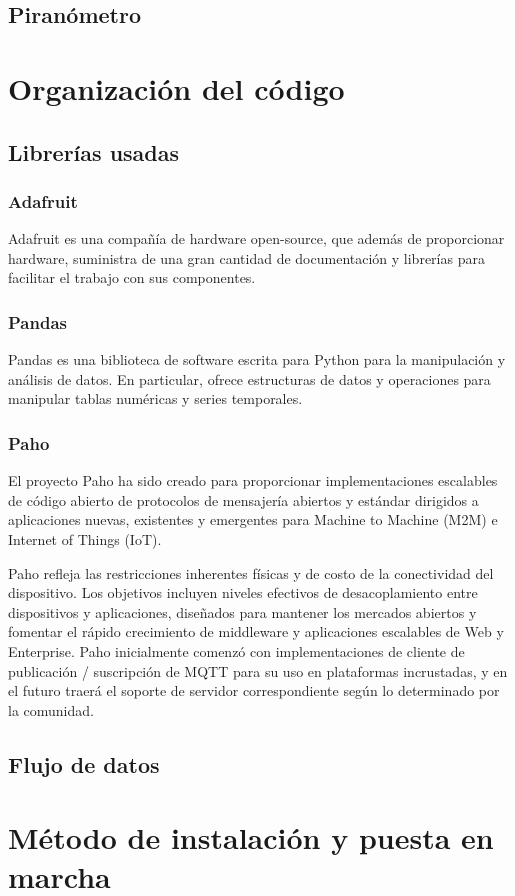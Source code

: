 \subsection{Piranómetro}


\section{Organización del código}
\label{makereference4.3} 
	\subsection{Librerías usadas}
		\subsubsection{Adafruit}
		Adafruit es una compañía de hardware open-source, que además de proporcionar hardware, suministra de una gran cantidad de documentación y librerías para facilitar el trabajo con sus componentes.
		
		\subsubsection{Pandas}
		Pandas es una biblioteca de software escrita para Python para la manipulación y análisis de datos. En particular, ofrece estructuras de datos y operaciones para manipular tablas numéricas y series temporales.
		
		\subsubsection{Paho}
		El proyecto Paho ha sido creado para proporcionar implementaciones escalables de código abierto de protocolos de mensajería abiertos y estándar dirigidos a aplicaciones nuevas, existentes y emergentes para Machine to Machine (M2M) e Internet of Things (IoT).
		
		Paho refleja las restricciones inherentes físicas y de costo de la conectividad del dispositivo. Los objetivos incluyen niveles efectivos de desacoplamiento entre dispositivos y aplicaciones, diseñados para mantener los mercados abiertos y fomentar el rápido crecimiento de middleware y aplicaciones escalables de Web y Enterprise. Paho inicialmente comenzó con implementaciones de cliente de publicación / suscripción de MQTT para su uso en plataformas incrustadas, y en el futuro traerá el soporte de servidor correspondiente según lo determinado por la comunidad.
		
	\subsection{Flujo de datos}

\section{Método de instalación y puesta en marcha}
\label{makereference4.4}